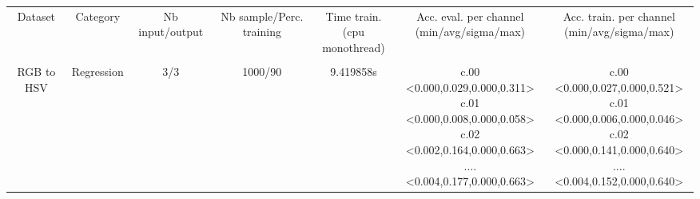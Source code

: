 \documentclass[8pt, a4paper]{article}
\begin{document}
\begin{landscape}
\begin{tabular}{|c|c|c|c|c|c|c|}
\hline
Dataset & Category & Nb input/output & Nb sample/Perc. training & \makecell{Time train.\\(cpu monothread)} & \makecell{Acc. eval. per channel\\(min/avg/sigma/max)} & \makecell{Acc. train. per channel\\(min/avg/sigma/max)}\\
\\
RGB to HSV & Regression & 3/3 & 1000/90 & 9.419858s & \makecell{c.00 <0.000,0.029,0.000,0.311>\\c.01 <0.000,0.008,0.000,0.058>\\c.02 <0.002,0.164,0.000,0.663>\\.... <0.004,0.177,0.000,0.663>\\} & \makecell{c.00 <0.000,0.027,0.000,0.521>\\c.01 <0.000,0.006,0.000,0.046>\\c.02 <0.000,0.141,0.000,0.640>\\.... <0.004,0.152,0.000,0.640>\\} \\
\hline
\end{tabular}\newpage
\end{landscape}
\end{document}
